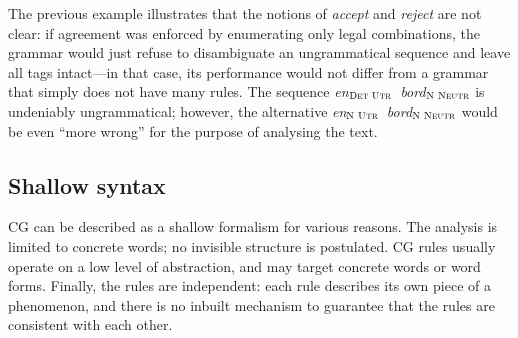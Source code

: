 {%

The previous example illustrates that the notions of \emph{accept} and \emph{reject} are not clear: if agreement was enforced
by enumerating only legal combinations, the grammar would just refuse to disambiguate
an ungrammatical sequence and leave all tags intact---in that case,
its performance would not differ from a grammar that simply does not have many rules.
The sequence \emph{en}$_{\textsc{Det Utr}}$~\emph{bord}$_{\textsc{N Neutr}}$ is undeniably ungrammatical; however, the alternative \emph{en}$_{\textsc{N Utr}}$~\emph{bord}$_{\textsc{N Neutr}}$  would be even ``more wrong'' for the purpose of analysing the text.




\subsection{Shallow syntax}\label{shallow-syntax}

CG can be described as a shallow formalism for various reasons. 
The analysis is limited to concrete words; no invisible structure is postulated.
CG rules usually operate on a low level of abstraction, and may target concrete words or word forms.
Finally, the rules are independent: each rule describes its own piece of a phenomenon, and there is no inbuilt mechanism to guarantee that the rules are consistent with each other.



}
